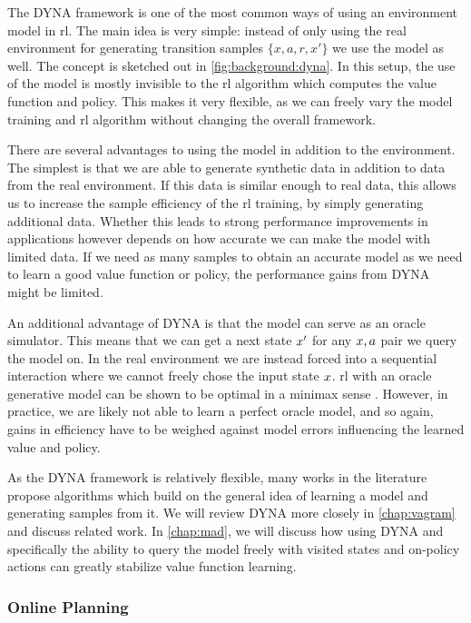 The DYNA framework \parencite{dyna} is one of the most common ways of using an environment model in \ac{rl}.
The main idea is very simple: instead of only using the real environment for generating transition samples $\{x,a,r,x'\}$ we use the model as well.
The concept is sketched out in \autoref{fig:background:dyna}.
In this setup, the use of the model is mostly invisible to the \ac{rl} algorithm which computes the value function and policy.
This makes it very flexible, as we can freely vary the model training and \ac{rl} algorithm without changing the overall framework.

There are several advantages to using the model in addition to the environment.
The simplest is that we are able to generate synthetic data in addition to data from the real environment.
If this data is similar enough to real data, this allows us to increase the sample efficiency of the \ac{rl} training, by simply generating additional data.
Whether this leads to strong performance improvements in applications however depends on how accurate we can make the model with limited data.
If we need as many samples to obtain an accurate model as we need to learn a good value function or policy, the performance gains from DYNA might be limited.

An additional advantage of DYNA is that the model can serve as an oracle simulator.
This means that we can get a next state $x'$ for any $x,a$ pair we query the model on.
In the real environment we are instead forced into a sequential interaction where we cannot freely chose the input state $x$.
\ac{rl} with an oracle generative model can be shown to be optimal in a minimax sense \parencite{agarwal2020model}.
However, in practice, we are likely not able to learn a perfect oracle model, and so again, gains in efficiency have to be weighed against model errors influencing the learned value and policy.

As the DYNA framework is relatively flexible, many works in the literature propose algorithms which build on the general idea of learning a model and generating samples from it.
We will review DYNA more closely in \autoref{chap:vagram} and discuss related work.
In \autoref{chap:mad}, we will discuss how using DYNA and specifically the ability to query the model freely with visited states and on-policy actions can greatly stabilize value function learning.

\subsubsection{Online Planning}

